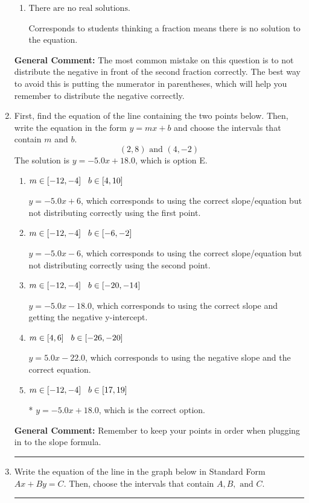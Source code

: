 \documentclass{extbook}[14pt]
\newcommand{\litem}[1]{\item #1

\rule{\textwidth}{0.4pt}}
\begin{document}
\begin{enumerate}
{\begin{enumerate}[label=\Alph*.]
$x = 0.260$, which corresponds to not distributing the negative in front of the first parentheses correctly.
\item \( \text{There are no real solutions.} \)

Corresponds to students thinking a fraction means there is no solution to the equation.
\end{enumerate}

\textbf{General Comment:} The most common mistake on this question is to not distribute the negative in front of the second fraction correctly. The best way to avoid this is putting the numerator in parentheses, which will help you remember to distribute the negative correctly.
}
\litem{
First, find the equation of the line containing the two points below. Then, write the equation in the form $ y=mx+b $ and choose the intervals that contain $m$ and $b$.
\[ (2, 8) \text{ and } (4, -2) \]The solution is \( y = -5.0x + 18.0 \), which is option E.\begin{enumerate}[label=\Alph*.]
\item \( m \in [-12, -4] \hspace*{3mm} b \in [4, 10] \)

 $y = -5.0x + 6$, which corresponds to using the correct slope/equation but not distributing correctly using the first point.
\item \( m \in [-12, -4] \hspace*{3mm} b \in [-6, -2] \)

 $y = -5.0x -6$, which corresponds to using the correct slope/equation but not distributing correctly using the second point.
\item \( m \in [-12, -4] \hspace*{3mm} b \in [-20, -14] \)

 $y = -5.0x -18.0$, which corresponds to using the correct slope and getting the negative y-intercept.
\item \( m \in [4, 6] \hspace*{3mm} b \in [-26, -20] \)

 $y = 5.0x -22.0$, which corresponds to using the negative slope and the correct equation.
\item \( m \in [-12, -4] \hspace*{3mm} b \in [17, 19] \)

* $y = -5.0x + 18.0$, which is the correct option.
\end{enumerate}

\textbf{General Comment:} Remember to keep your points in order when plugging in to the slope formula.
}
\litem{
Write the equation of the line in the graph below in Standard Form $Ax+By=C$. Then, choose the intervals that contain $A, B, \text{ and } C$.

}
\end{enumerate}
\end{document}
